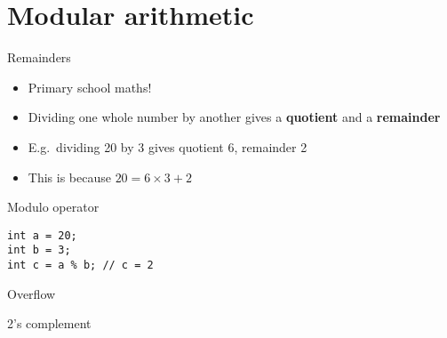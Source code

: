 \part{Modular arithmetic}
\frame{\partpage}

\begin{frame}{Remainders}
	\begin{itemize}
		\pause\item Primary school maths!
		\pause\item Dividing one whole number by another gives a \textbf{quotient} and a \textbf{remainder}
		\pause\item E.g.\ dividing 20 by 3 gives quotient 6, remainder 2
		\pause\item This is because $20 = 6 \times 3 + 2$
	\end{itemize}
\end{frame}

\begin{frame}[fragile]{Modulo operator}
	\begin{lstlisting}
int a = 20;
int b = 3;
int c = a % b; // c = 2
	\end{lstlisting}
\end{frame}

\begin{frame}[fragile]{Overflow}
\end{frame}

\begin{frame}[fragile]{2's complement}
\end{frame}


